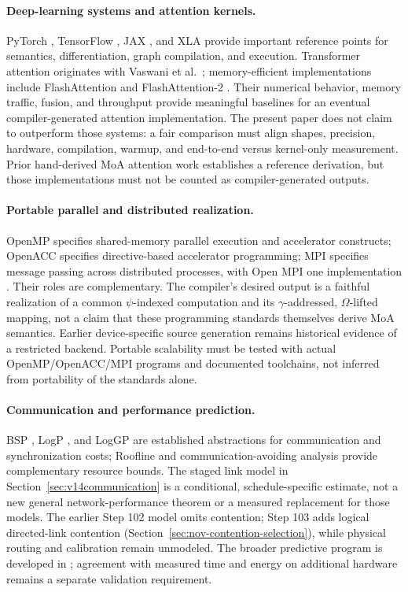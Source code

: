 \documentclass[11pt]{article}
\begin{document}
\paragraph{Deep-learning systems and attention kernels.}
PyTorch \cite{pytorch}, TensorFlow \cite{tensorflow}, JAX \cite{jax}, and XLA \cite{xla} provide important reference points for semantics, differentiation, graph compilation, and execution. Transformer attention originates with Vaswani et al.\ \cite{transformer}; memory-efficient implementations include FlashAttention and FlashAttention-2 \cite{flashattention,flashattention2}. Their numerical behavior, memory traffic, fusion, and throughput provide meaningful baselines for an eventual compiler-generated attention implementation. The present paper does not claim to outperform those systems: a fair comparison must align shapes, precision, hardware, compilation, warmup, and end-to-end versus kernel-only measurement. Prior hand-derived MoA attention work \cite{paper1} establishes a reference derivation, but those implementations must not be counted as compiler-generated outputs.

\paragraph{Portable parallel and distributed realization.}
OpenMP \cite{openmp} specifies shared-memory parallel execution and accelerator constructs; OpenACC \cite{openacc} specifies directive-based accelerator programming; MPI \cite{mpi40} specifies message passing across distributed processes, with Open MPI one implementation \cite{openmpi}. Their roles are complementary. The compiler's desired output is a faithful realization of a common $\psi$-indexed computation and its $\gamma$-addressed, $\Omega$-lifted mapping, not a claim that these programming standards themselves derive MoA semantics. Earlier device-specific source generation remains historical evidence of a restricted backend. Portable scalability must be tested with actual OpenMP/OpenACC/MPI programs and documented toolchains, not inferred from portability of the standards alone.

\paragraph{Communication and performance prediction.}
BSP \cite{bsp}, LogP \cite{logp}, and LogGP \cite{loggp} are established abstractions for communication and synchronization costs; Roofline \cite{roofline} and communication-avoiding analysis \cite{ballard} provide complementary resource bounds. The staged link model in Section~\ref{sec:v14communication} is a conditional, schedule-specific estimate, not a new general network-performance theorem or a measured replacement for those models. The earlier Step 102 model omits contention; Step 103 adds logical directed-link contention (Section~\ref{sec:nov-contention-selection}), while physical routing and calibration remain unmodeled. The broader predictive program is developed in \cite{gap}; agreement with measured time and energy on additional hardware remains a separate validation requirement.
\end{document}
